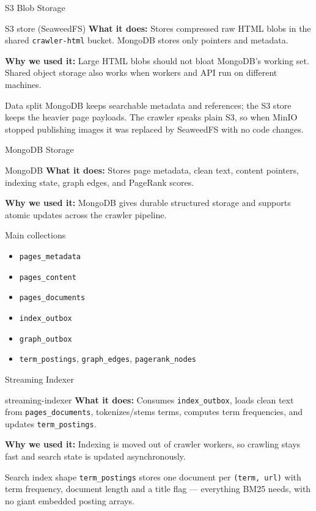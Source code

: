 \documentclass[aspectratio=169,11pt]{beamer}
\newcommand{\component}[3]{%
  \begin{block}{#1}
    \textbf{What it does:} #2

    \vspace{0.35em}
    \textbf{Why we used it:} #3
  \end{block}
}
\begin{document}
\begin{frame}{S3 Blob Storage}
  \component{S3 store (SeaweedFS)}
  {Stores compressed raw HTML blobs in the shared \texttt{crawler-html} bucket. MongoDB stores only pointers and metadata.}
  {Large HTML blobs should not bloat MongoDB's working set. Shared object storage also works when workers and API run on different machines.}

  \begin{block}{Data split}
    MongoDB keeps searchable metadata and references; the S3 store keeps the heavier page payloads. The crawler speaks plain S3, so when MinIO stopped publishing images it was replaced by SeaweedFS with no code changes.
  \end{block}
\end{frame}

\begin{frame}{MongoDB Storage}
  \small
  \component{MongoDB}
  {Stores page metadata, clean text, content pointers, indexing state, graph edges, and PageRank scores.}
  {MongoDB gives durable structured storage and supports atomic updates across the crawler pipeline.}

  \begin{block}{Main collections}
    \begin{itemize}
      \item \texttt{pages\_metadata}
      \item \texttt{pages\_content}
      \item \texttt{pages\_documents}
      \item \texttt{index\_outbox}
      \item \texttt{graph\_outbox}
      \item \texttt{term\_postings}, \texttt{graph\_edges}, \texttt{pagerank\_nodes}
    \end{itemize}
  \end{block}
\end{frame}

\begin{frame}{Streaming Indexer}
  \component{streaming-indexer}
  {Consumes \texttt{index\_outbox}, loads clean text from \texttt{pages\_documents}, tokenizes/stems terms, computes term frequencies, and updates \texttt{term\_postings}.}
  {Indexing is moved out of crawler workers, so crawling stays fast and search state is updated asynchronously.}

  \begin{block}{Search index shape}
    \texttt{term\_postings} stores one document per \texttt{(term, url)} with term frequency, document length and a title flag --- everything BM25 needs, with no giant embedded posting arrays.
  \end{block}
\end{frame}
\end{document}
